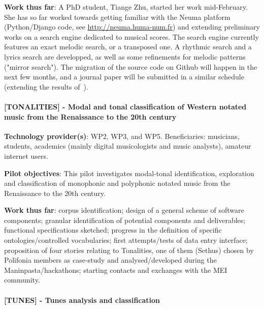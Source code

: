 \textbf{Work thus far}: A PhD student, Tiange Zhu, started her work mid-February. She has so far worked towards getting familiar with the Neuma platform (Python/Django code, see \url{http://neuma.huma-num.fr}) and extending preliminary works on a search engine dedicated to musical scores. The search engine currently features an exact melodic search, or a transposed one. A rhythmic search and a lyrics search are developped, as well as some refinements for melodic patterns ("mirror search"). The migration of the source code on Github will happen in the next few months, and a journal paper will be submitted in a similar schedule (extending the results of~\cite{rigaux2019scalable}).


\paragraph*{[TONALITIES] - Modal and tonal classification of Western notated music from the Renaissance to the 20th century}\label{sec:pilot:tonalities}
\textbf{Technology provider(s)}: WP2, WP3, and WP5. Beneficiaries: musicians, students, academics (mainly digital musicologists and music analysts), amateur internet users.

\textbf{Pilot objectives}: 
This pilot investigates modal-tonal identification, exploration and classification of monophonic and polyphonic notated music from the Renaissance to the 20th century.

\textbf{Work thus far}:
corpus identification; design of a general scheme of software components; granular identification of potential components and deliverables; functional specifications sketched; progress in the definition of specific ontologies/controlled vocabularies; first attempts/tests of data entry interface; proposition of four stories relating to Tonalities, one of them (Sethus) chosen by Polifonia members as case-study and analysed/developed during the Maninpasta/hackathons; starting contacts and exchanges with the MEI community.

\paragraph*{[TUNES] - Tunes analysis and classification}\label{sec:pilot:tunes}


